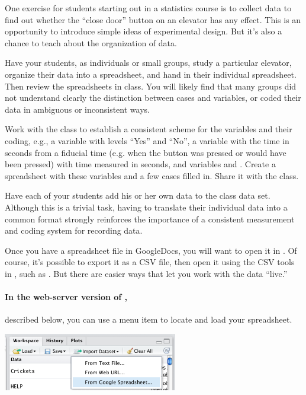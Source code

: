 \begin{example}
One exercise for students starting out in a statistics course is to
collect data to find out whether the ``close door'' button on an
elevator has any effect.  This is an opportunity to introduce simple
ideas of experimental design.  But it's also a chance to teach about
the organization of data.

Have your students, as individuals or small groups, study a particular
elevator, organize their data into a spreadsheet, and hand in their
individual spreadsheet.  Then review the spreadsheets in class.  You
will likely find that many groups did not understand clearly the
distinction between cases and variables, or coded their data in
ambiguous or inconsistent ways.

Work with the class to establish a consistent scheme for the variables
and their coding, e.g.,  a variable  with levels
``Yes'' and ``No'',  a variable  with the time in seconds
from a fiducial time (e.g. when the button was pressed or would have
been pressed) with time measured in seconds, and variables 
and .  Create a spreadsheet
with these variables and a few cases filled in.  Share it with the class.

Have each of your students add his or her own data to the class data
set.  Although this is a trivial task, having to translate their
individual data into a common format strongly reinforces the
importance of a consistent measurement and coding system for recording
data. 
\end{example}

Once you have a spreadsheet file in GoogleDocs, you will want to open
it in \R.  Of course, it's possible to export it as a CSV file, then
open it using the CSV tools in \R, such as .
But there are easier ways that let you work with the data ``live.''

\paragraph{In the web-server version of \RStudio,} described below, you can
  use a menu item to locate and load your spreadsheet.

\begin{center}
  \includegraphics[width=3in]{images/google-spreadsheet1.png}
\end{center}

